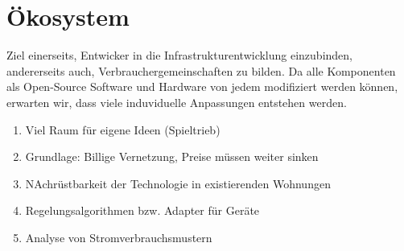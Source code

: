 \section{Ökosystem}\label{sec:ökosystem}
Ziel einerseits, Entwicker in die Infrastrukturentwicklung einzubinden,
andererseits auch, Verbrauchergemeinschaften zu bilden. Da alle
Komponenten als Open-Source Software und Hardware von jedem modifiziert
werden können, erwarten wir, dass viele induviduelle Anpassungen
entstehen werden.


\begin{enumerate}
  \item Viel Raum für eigene Ideen (Spieltrieb)
  \item Grundlage: Billige Vernetzung, Preise müssen weiter sinken
  \item NAchrüstbarkeit der Technologie in existierenden Wohnungen
  \item Regelungsalgorithmen bzw. Adapter für Geräte
  \item Analyse von Stromverbrauchsmustern
\end{enumerate}

